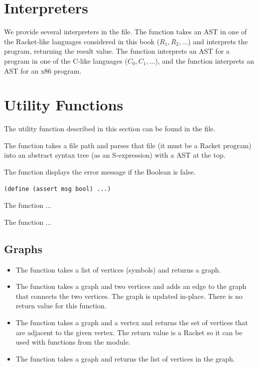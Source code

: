 \documentclass[11pt]{book}
\begin{document}
\section{Interpreters}
\label{appendix:interp}

We provide several interpreters in the  file.  The
 function takes an AST in one of the Racket-like
languages considered in this book ($R_1, R_2, \ldots$) and interprets
the program, returning the result value.  The  function
interprets an AST for a program in one of the C-like languages ($C_0,
C_1, \ldots$), and the  function interprets an AST
for an x86 program.

\section{Utility Functions}
\label{appendix:utilities}

The utility function described in this section can be found in the
 file.

The  function takes a file path and parses that file
(it must be a Racket program) into an abstract syntax tree (as an
S-expression) with a  AST at the top.

The  function displays the error message  if the
Boolean  is false.
\begin{lstlisting}
(define (assert msg bool) ...)
\end{lstlisting}

The  function ...

The  function ...


\subsection{Graphs}

\begin{itemize}
\item The  function takes a list of vertices
  (symbols) and returns a graph.

\item The  function takes a graph and two vertices and
  adds an edge to the graph that connects the two vertices. The graph
  is updated in-place. There is no return value for this function.

\item The  function takes a graph and a vertex and
  returns the set of vertices that are adjacent to the given
  vertex. The return value is a Racket  so it can be
  used with functions from the  module.

\item The  function takes a graph and returns the list
  of vertices in the graph.
\end{itemize}
\end{document}
